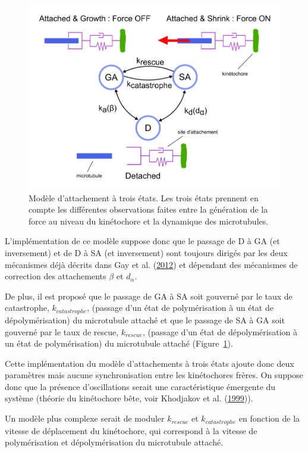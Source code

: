 \documentclass[12pt,a4paper,twoside,openright]{book}
\begin{document}
\begin{figure}[htbp]
\centering
\includegraphics{figures/results/modelling/three_states.png}
\caption{\label{fig:three_states}Modèle d'attachement à trois états. Les
trois états prennent en compte les différentes observations faites entre
la génération de la force au niveau du kinétochore et la dynamique des
microtubules.}
\end{figure}

L'implémentation de ce modèle suppose donc que le passage de D à GA (et
inversement) et de D à SA (et inversement) sont toujours dirigés par les
deux mécanismes déjà décrits dans Gay et al.
(\protect\hyperlink{ref-Gay2012a}{2012}) et dépendant des mécanismes de
correction des attachements \(\beta\) et \(d_{\alpha}\).

De plus, il est proposé que le passage de GA à SA soit gouverné par le
taux de catastrophe, \(k_{catastrophe}\), (passage d'un état de
polymérisation à un état de dépolymérisation) du microtubule attaché et
que le passage de SA à GA soit gouverné par le taux de rescue,
\(k_{rescue}\), (passage d'un état de dépolymérisation à un état de
polymérisation) du microtubule attaché (Figure~\ref{fig:three_states}).

Cette implémentation du modèle d'attachements à trois états ajoute donc
deux paramètres mais aucune synchronisation entre les kinétochores
frères. On suppose donc que la présence d'oscillations serait une
caractéristique émergente du système (théorie du kinétochore bête, voir
Khodjakov et al. (\protect\hyperlink{ref-Khodjakov1999}{1999})).

Un modèle plus complexe serait de moduler \(k_{rescue}\) et
\(k_{catastrophe}\) en fonction de la vitesse de déplacement du
kinétochore, qui correspond à la vitesse de polymérisation et
dépolymérisation du microtubule attaché.
\end{document}
